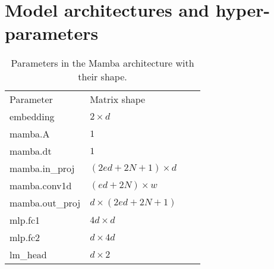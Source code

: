 \newpage
\section{Model architectures and hyper-parameters}
\label{app:architecture}

\begin{table}[h]
\caption{Parameters in the Mamba architecture with their shape.}
\label{tab:mamba-parameters}
\vspace{1mm}
\small%
\begin{tabularx}{\linewidth}{Xllr}
\toprule
Parameter
& Matrix shape \\
\cmidrule(lr){1-2}
embedding
& $2 \times d$ \\
mamba.A
& $1$ \\
mamba.dt
& $1$ \\
mamba.in\_proj
& $(2ed + 2N + 1) \times d$ \\
mamba.conv1d
& $(ed + 2N) \times w$ \\
mamba.out\_proj
& $d \times (2ed + 2N + 1)$ \\
mlp.fc1 
& $4d \times d$ \\
mlp.fc2
& $d \times 4d$ \\
lm\_head
& $d \times 2$ \\
\bottomrule
\end{tabularx}
\end{table}

